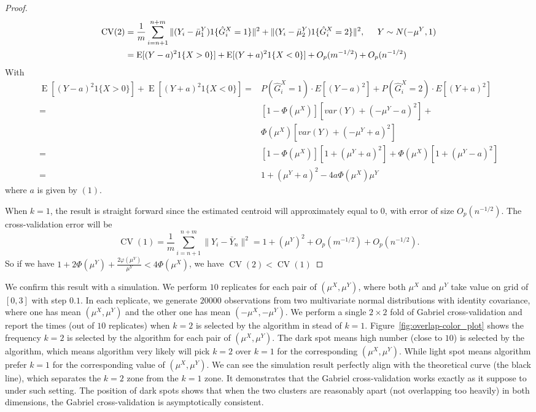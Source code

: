 \documentclass[12pt]{article}
\newcommand{\CV}{\operatorname{CV}}
\newcommand{\E}{\operatorname{E}}
\newcommand{\OhP}{O_p}
\newcommand{\muX}{\mu^{X}}
\newcommand{\muY}{\mu^{Y}}
\newcommand{\bmuY}{\bar \mu^{Y}}
\newcommand{\hGX}{\hat G^{X}}
\begin{document}
\begin{proof}
\begin{align*}
  \CV(2)
  &=
    \frac{1}{m}
    \sum_{i=n+1}^{n+m}
      \| (Y_i - \bmuY_1) 1\{\hGX_i = 1\} \|^2
      +
      \| (Y_i - \bmuY_2) 1\{\hGX_i = 2\} \|^2, \hspace{0.2in}Y\sim N(-\mu^Y,1)
\\
  &=
    \E[(Y - a)^2 1\{ X > 0\}] + \E[(Y + a)^2 1\{X < 0\}]
      + \OhP(m^{-1/2}) + \OhP(n^{-1/2})\\
   \end{align*}
   With 
   \begin{align}
 \E[(Y - a)^2 1\{ X > 0\}] + \E[(Y + a)^2 1\{X < 0\}]  =& P(\hGX_i = 1)\cdot E[(Y - a)^2] + P(\hGX_i = 2)\cdot E[(Y + a)^2] \nonumber \\  \nonumber
 =& [1-\Phi(\mu^X)][var(Y)+(-\mu^Y - a)^2]+\\ \nonumber
  & \Phi(\mu^X)[var(Y)+(-\mu^Y + a)^2]\\  \nonumber
  =& [1-\Phi(\mu^X)][1+(\mu^Y + a)^2]+\Phi(\mu^X)[1+(\mu^Y -a )^2]   \\  \nonumber
  =& 1+(\mu^Y + a)^2 -4a\Phi(\mu^X)\mu^Y  \nonumber
\end{align}
where $a$ is given by $(1)$.

When $k=1$, the result is straight forward since the estimated centroid will approximately equal to
$0$, with error of size $\OhP(n^{-1/2})$. The cross-validation error
will be
\[
  \CV(1) = \frac{1}{m} \sum_{i=n+1}^{n+m} \| Y_i - \bar Y_n \|^2
         = 1 + (\mu^Y)^2 + \OhP(m^{-1/2}) + \OhP(n^{-1/2}).
\]
So if we have $1 + 2\Phi(\mu^Y)+ \frac{2\varphi(\mu^Y)}{\mu^Y} < 4\Phi(\mu^X)$, we have $\CV(2) < \CV(1)$
\end{proof}

We confirm this result with a simulation.  We perform $10$ replicates for each pair of $(\mu^X, \mu^Y)$, where both $\mu^X$ and $\mu^Y$ take value on grid of $[0,3]$ with step $0.1$.  In each
replicate, we generate $20000$ observations from two multivariate normal distributions with identity covariance, where one has mean $(\muX, \muY)$ and the other one has mean $(-\muX, -\muY)$.
We perform a single $2 \times 2$ fold of Gabriel cross-validation and report the
times (out of $10$ replicates) when $k=2$ is selected by the algorithm in stead of $k=1$. Figure~\ref{fig:overlap-color_plot} shows the frequency $k=2$ is selected by the algorithm for each pair of $(\mu^X, \mu^Y)$. The dark spot means high number (close to $10$) is selected by the algorithm, which means algorithm very likely will pick $k=2$ over $k=1$ for the corresponding $(\mu^X, \mu^Y)$. While light spot means algorithm prefer $k=1$ for the corresponding value of $(\mu^X, \mu^Y)$. We can see the simulation result perfectly align with the theoretical curve (the black line), which separates the $k=2$ zone from the $k=1$ zone. It demonstrates that the Gabriel cross-validation works exactly as it suppose to under such setting. The position of dark spots shows that when the two clusters are reasonably apart (not overlapping too heavily) in both dimensions, the Gabriel cross-validation is asymptotically consistent.
\end{document}
